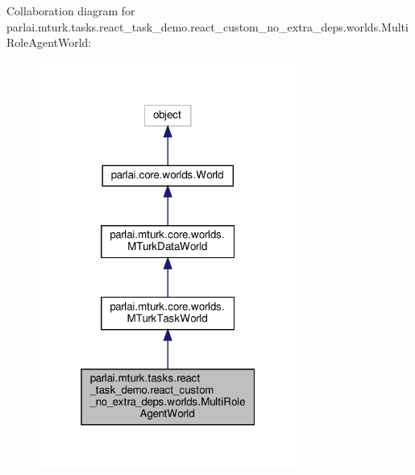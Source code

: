 Collaboration diagram for parlai.\+mturk.\+tasks.\+react\+\_\+task\+\_\+demo.\+react\+\_\+custom\+\_\+no\+\_\+extra\+\_\+deps.\+worlds.\+Multi\+Role\+Agent\+World\+:\nopagebreak
\begin{figure}[H]
\begin{center}
\leavevmode
\includegraphics[width=241pt]{d2/dda/classparlai_1_1mturk_1_1tasks_1_1react__task__demo_1_1react__custom__no__extra__deps_1_1worlds_1ca4c2b8ce290eb3f18f3c3ed532054f1}
\end{center}
\end{figure}
